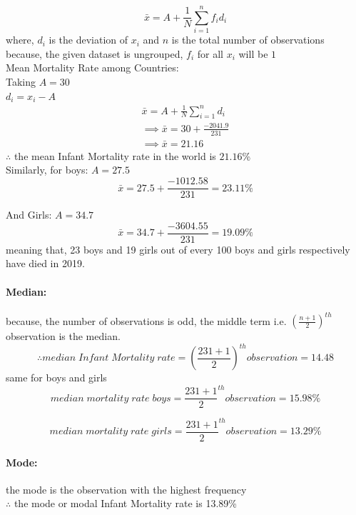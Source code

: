 \documentclass[12pt]{article}
\begin{document}
$$ \bar{x} = A + \frac{1}{N} \sum_{i=1}^{n}f_id_i$$
where, $d_i$ is the deviation of $x_i$ and $n$ is the total number of observations\\
because, the given dataset is ungrouped, $f_i$ for all $x_i$ will be $1$\\
Mean Mortality Rate among Countries:\\
Taking $A = 30$\\
$d_i = x_i - A$
\begin{equation}
\begin{aligned}
\bar{x} =  A + \frac{1}{N} \sum_{i=1}^n d_i \\ \implies \bar{x} = 30 + \frac{-2041.9}{231} \\ \implies \bar{x} = 21.16
\end{aligned}
\end{equation}
$\therefore$ the mean Infant Mortality rate in the world is $21.16$\%\\
Similarly, for boys:
$A = 27.5$
\begin{equation}
\bar{x} =  27.5 + \frac{-1012.58}{231} = 23.11\%
\end{equation}

And Girls:
$A = 34.7$
\begin{equation}
\bar{x} = 34.7 + \frac{-3604.55}{231} = 19.09\%
\end{equation}
meaning that, 23 boys and 19 girls out of every 100 boys and girls respectively have died in 2019.\\

\paragraph{Median: }
because, the number of observations is odd, the middle term i.e. $\left(\frac{n+1}{2}\right)^{th}$ observation is the median.\\
$$\therefore median \; Infant \; Mortality \; rate = \left(\frac{231 + 1}{2}\right)^{th} observation = 14.48$$
same for boys and girls\\
$$ median \; mortality \; rate \; boys = \frac{231 + 1}{2}^{th} observation = 15.98\% $$

$$ median \; mortality \; rate \; girls = \frac{231 + 1}{2}^{th} observation = 13.29\% $$
\paragraph{Mode: }
the mode is the observation with the highest frequency \\
$\therefore$ the mode or modal Infant Mortality rate is 13.89\%\\
\end{document}
